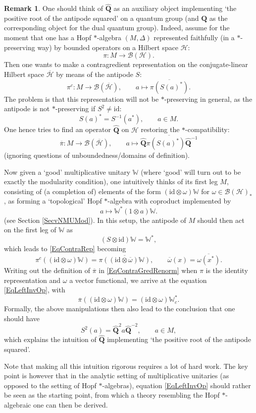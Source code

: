 \documentclass[11pt, reqno]{amsart}
\theoremstyle{definition}
\newtheorem{remark}[theorem]{Remark}
\numberwithin{equation}{section}
\def\Hc{\mathcal H}
\newcommand{\Hsp}{\mathcal{H}}
\newcommand{\Bc}{\mathcal{B}}
\newcommand{\Qb}{\mathbf{Q}}
\newcommand{\id}{\mathrm{id}}
\newcommand{\Wbb}{\mathbb{W}}
\newcommand{\wWbb}{\mathbb{W}_c}
\begin{document}
\begin{remark}
One should think of $\hat{\Qb}$ as an auxiliary object implementing `the positive root of the antipode squared' on a quantum group (and $\Qb$ as the corresponding object for the dual quantum group). Indeed, assume for the moment that one has a  Hopf $*$-algebra $(M,\Delta)$ represented faithfully (in a $*$-preserving way) by bounded operators on a Hilbert space $\Hc$:
\[
\pi\colon  M \rightarrow \Bc(\Hc). 
\]
Then one wants to make a contragredient representation on the conjugate-linear Hilbert space $\overline{\Hsp}$ by means of the antipode $S$: 
\begin{equation}\label{EqContraRep}
\pi^c\colon M \rightarrow \Bc(\overline{\Hc}),\qquad a \mapsto \overline{\pi(S(a)^*)}.
\end{equation}
The problem is that this representation will not be $*$-preserving in general, as the antipode is not $*$-preserving if $S^2 \neq \id$: 
\[
S(a)^* = S^{-1}(a^*),\qquad a\in M.
\]
One hence tries to find an operator $\hat{\Qb}$ on $\Hc$ restoring the $*$-compatibility: 
\begin{equation}\label{EqContraGredRenorm}
\overline{\pi}\colon M \rightarrow \Bc(\overline{\Hc}),\qquad a \mapsto \overline{\hat{\Qb}\pi(S(a)^*)\hat{\Qb}^{-1}}
\end{equation}
(ignoring questions of unboundedness/domains of definition).

Now given a `good' multiplicative unitary $\Wbb$ (where `good' will turn out to be exactly the modularity condition), one intuitively thinks of its first leg $M$, consisting of (a completion of) elements of the form $(\id\otimes \omega)\Wbb$ for $\omega \in \Bc(\Hc)_*$, as forming a `topological' Hopf $*$-algebra with coproduct implemented by 
\begin{equation}\label{EqCoprodInt}
a \mapsto \Wbb^*(1\otimes a)\Wbb.
\end{equation}
(see Section \ref{SecvNMUMod}). In this setup, the antipode of $M$ should then act on the first leg of $\Wbb$ as 
\[
(S\otimes \id)\Wbb = \Wbb^*,
\]
which leads to \eqref{EqContraRep} becoming 
\[
\pi^c((\id\otimes \omega)\Wbb) = \overline{\pi((\id\otimes \overline{\omega})\Wbb)}, \qquad \overline{\omega}(x) = \overline{\omega(x^*)}. 
\]
Writing out the definition of $\overline{\pi}$ in  \eqref{EqContraGredRenorm} when $\pi$ is the identity representation and $\omega$ a vector functional, we arrive at the equation \eqref{EqLeftInvOp}, with 
\[
\overline{\pi}((\id\otimes \omega)\Wbb) = (\id\otimes \omega)\wWbb^*.
\]
Formally, the above manipulations then also lead to the conclusion that one should have 
\[
S^2(a) = \hat{\Qb}^2a\hat{\Qb}^{-2},\qquad a\in M,
\]
which explains the intuition of $\hat{\Qb}$ implementing `the positive root of the antipode squared'.

Note that making all this intuition rigorous requires a lot of hard work. The key point is however that in the analytic setting of multiplicative unitaries (as opposed to the setting of Hopf $*$-algebras), equation \eqref{EqLeftInvOp} should rather be seen as the starting point, from which a theory resembling the Hopf $*$-algebraic one can then be derived.
\end{remark}
\end{document}

